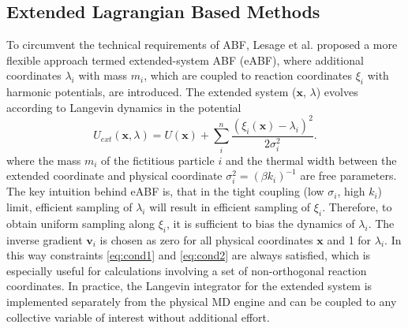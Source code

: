 \newpage
\subsection{Extended Lagrangian Based Methods}
\label{sec:eABF}
To circumvent the technical requirements of ABF, Lesage et al.\autocite{lesage2017smoothed} proposed a more flexible approach termed extended-system ABF (eABF), where additional coordinates $\lambda_i$ with mass $m_{i}$, which are coupled to reaction coordinates $\xi_i$ with harmonic potentials, are introduced. The extended system ($\textbf{x}$, $\lambda$) evolves according to Langevin dynamics in the potential
\begin{equation}
  U_{ext}(\textbf{x},\lambda) = U(\textbf{x}) + \sum_i^n \frac{(\xi_{i}(\textbf{x})-\lambda_i)^2}{2\sigma_i^2}.
\end{equation}
where the mass $m_i$ of the fictitious particle $i$ and the thermal width between the extended coordinate and physical coordinate $\sigma_i^2=(\beta k_i)^{-1}$ are free parameters.
The key intuition behind eABF is, that in the tight coupling (low $\sigma_i$, high $k_i$) limit, efficient sampling of $\lambda_i$ will result in efficient sampling of $\xi_i$.
Therefore, to obtain uniform sampling along $\xi_i$, it is sufficient to bias the dynamics of $\lambda_i$. The inverse gradient $\textbf{v}_i$ is chosen as zero for all physical coordinates $\textbf{x}$ and 1 for $\lambda_i$.
In this way constraints \ref{eq:cond1} and \ref{eq:cond2} are always satisfied, which is especially useful for calculations involving a set of non-orthogonal reaction coordinates.
In practice, the Langevin integrator for the extended system is implemented separately from the physical MD engine and can be coupled to any collective variable of interest without additional effort.

